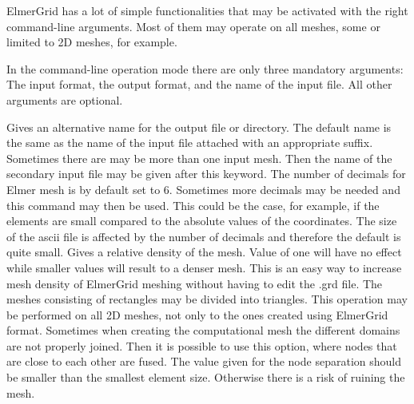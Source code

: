 ElmerGrid has a lot of simple functionalities that may be activated 
with the right command-line arguments. Most of them may operate on
all meshes, some or limited to 2D meshes, for example. 

In the command-line operation mode
there are only three mandatory arguments: The input format,
the output format, and the name of the input file.
All other arguments are optional.

\sifbegin
{}
Gives an alternative name for the output file or directory. 
The default name is the same as the name of the input file
attached with an appropriate suffix. 
%
Sometimes there are may be more than one input mesh. 
Then the name of the secondary input file may be given 
after this keyword.
%
The number of decimals for Elmer mesh is by default set to 6.
Sometimes more decimals may be needed and this command may then
be used. This could be the case, for example, if the elements are 
small compared to the absolute values of the coordinates.
The size of the ascii file is affected by the number of 
decimals and therefore the default is quite small.
%
Gives a relative density of the mesh. Value of one will have no effect
while smaller values will result to a denser mesh. This is an easy way to 
increase mesh density of ElmerGrid meshing without having to edit the .grd file. 
%
The meshes consisting of rectangles may be divided into 
triangles. This operation may be performed on all 2D meshes, 
not only to the ones created using ElmerGrid format.
%
Sometimes when creating the computational mesh the 
different domains are not properly joined. Then it is possible to 
use this option, where nodes that are close to each other are
fused. The value given for the node separation should be smaller than
the smallest element size. Otherwise there is a risk of ruining the mesh.

